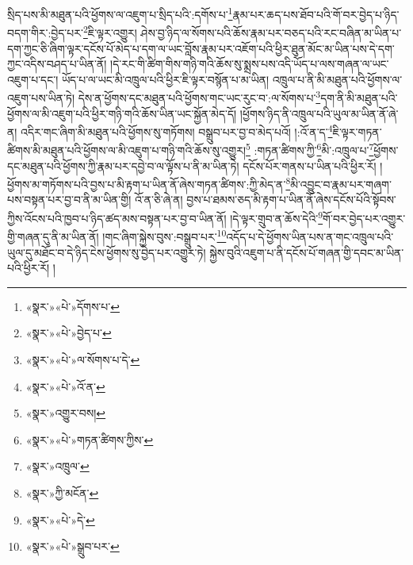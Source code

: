 སྲིད་པས་མི་མཐུན་པའི་ཕྱོགས་ལ་འཇུག་པ་སྲིད་པའི་:དགོས་པ་\footnote{«སྣར་»«པེ་»དོགས་པ་}རྣམ་པར་ཆད་པས་ཐོབ་པའི་གོ་བར་བྱེད་པ་ཉིད་བདག་གིར་:བྱེད་པར་\footnote{«སྣར་»«པེ་»བྱེད་པ་}ཇི་ལྟར་འགྱུར། ཤེས་བྱ་ཉིད་ལ་སོགས་པའི་ཆོས་རྣམ་པར་བཅད་པའི་རང་བཞིན་མ་ཡིན་པ་དག་ཀྱང་ཅི་ཞིག་ལྟར་དངོས་པོ་མེད་པ་དག་ལ་ཡང་བློས་རྣམ་པར་འཇོག་པའི་ཕྱིར་ཐུན་མོང་མ་ཡིན་པས་དེ་དག་ཀྱང་འདིས་བཤད་པ་ཡིན་ནོ། །དེ་རང་གི་ཚིག་གིས་གཉི་གའི་ཆོས་སུ་སྨྲས་པས་འདི་ཡོད་པ་ལས་གཞན་ལ་ཡང་འཇུག་པ་དང་། ཡོད་པ་ལ་ཡང་མི་འཁྲུལ་པའི་ཕྱིར་ཇི་ལྟར་བསྙོན་པ་མ་ཡིན། འཁྲུལ་པ་ནི་མི་མཐུན་པའི་ཕྱོགས་ལ་འཇུག་པས་ཡིན་ཏེ། དེས་ན་ཕྱོགས་དང་མཐུན་པའི་ཕྱོགས་གང་ཡང་རུང་བ་:ལ་སོགས་པ་\footnote{«སྣར་»«པེ་»ལ་སོགས་པ་དེ་}དག་ནི་མི་མཐུན་པའི་ཕྱོགས་ལ་མི་འཇུག་པའི་ཕྱིར་གཉི་གའི་ཆོས་ཡིན་ཡང་སྐྱོན་མེད་དོ། །ཕྱོགས་ཉིད་ནི་འཁྲུལ་པའི་ཡུལ་མ་ཡིན་ནོ་ཞེ་ན། འདིར་གང་ཞིག་མི་མཐུན་པའི་ཕྱོགས་སུ་གཏོགས། བསྒྲུབ་པར་བྱ་བ་མེད་པའོ། །:འོ་ན་ད་\footnote{«སྣར་»«པེ་»འོ་ན་}ཇི་ལྟར་གཏན་ཚིགས་མི་མཐུན་པའི་ཕྱོགས་ལ་མི་འཇུག་པ་གཉི་གའི་ཆོས་སུ་འགྱུར།\footnote{«སྣར་»འགྱུར་བས།} :གཏན་ཚིགས་ཀྱི་\footnote{«སྣར་»«པེ་»གཏན་ཚིགས་ཀྱིས་}མི་:འཁྲུལ་པ་\footnote{«སྣར་»འཁྲུལ་}ཕྱོགས་དང་མཐུན་པའི་ཕྱོགས་ཀྱི་རྣམ་པར་དབྱེ་བ་ལ་ལྟོས་པ་ནི་མ་ཡིན་ཏེ། དངོས་པོར་གནས་པ་ཡིན་པའི་ཕྱིར་རོ། །ཕྱོགས་མ་གཏོགས་པའི་བྱས་པ་མི་རྟག་པ་ཡིན་ནོ་ཞེས་གཏན་ཚིགས་:ཀྱི་མེད་ན་\footnote{«སྣར་»ཀྱི་མངོན་}མི་འབྱུང་བ་རྣམ་པར་གཞག་པས་བསྟན་པར་བྱ་བ་ནི་མ་ཡིན་གྱི། འོ་ན་ཅི་ཞེ་ན། བྱས་པ་ཐམས་ཅད་མི་རྟག་པ་ཡིན་ནོ་ཞེས་དངོས་པོའི་སྟོབས་ཀྱིས་འོངས་པའི་ཁྱབ་པ་ཉིད་ཚད་མས་བསྟན་པར་བྱ་བ་ཡིན་ནོ། །དེ་ལྟར་གྲུབ་ན་ཆོས་དེའི་\footnote{«སྣར་»«པེ་»དེ་}གོ་བར་བྱེད་པར་འགྱུར་གྱི་གཞན་དུ་ནི་མ་ཡིན་ནོ། །གང་ཞིག་སྐྱེས་བུས་:བསྒྲུབ་པར་\footnote{«སྣར་»«པེ་»སྒྲུབ་པར་}འདོད་པ་དེ་ཕྱོགས་ཡིན་པས་ན་གང་འཁྲུལ་པའི་ཡུལ་དུ་མཐོང་བ་དེ་ཉིད་ངེས་ཕྱོགས་སུ་བྱེད་པར་འགྱུར་ཏེ། སྐྱེས་བུའི་འཇུག་པ་ནི་དངོས་པོ་གཞན་གྱི་དབང་མ་ཡིན་པའི་ཕྱིར་རོ། །
